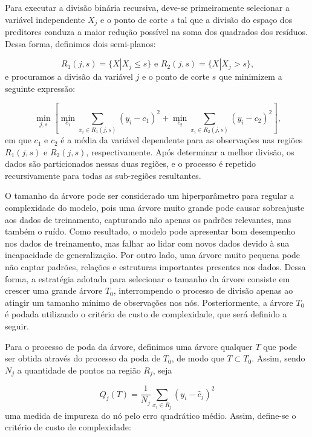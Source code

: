 \documentclass[
  12pt,
  a4paper,
]{scrreprt}
\begin{document}
\vspace{12pt}

Para executar a divisão binária recursiva, deve-se primeiramente
selecionar a variável independente \(X_j\) e o ponto de corte \(s\) tal
que a divisão do espaço dos preditores conduza a maior redução possível
na soma dos quadrados dos resíduos. Dessa forma, definimos dois
semi-planos:

\[
R_{1}\left(j, s\right) = \{X | X_j \leq s\} \text{ e } R_{2}\left(j, s\right) = \{X | X_j > s\}\text{,}
\] e procuramos a divisão da variável \(j\) e o ponto de corte \(s\) que
minimizem a seguinte expressão:

\[
\min_{j, s}\left[\min_{c_1} \sum_{x_i \in R_1\left(j, s\right)} \left(y_i - c_{1}\right)^2 + \min_{c_2} \sum_{x_i \in R_2\left(j, s\right)} \left(y_i - c_{2}\right)^2\right]\text{,}
\] em que \(c_1\) e \(c_2\) é a média da variável dependente para as
observações nas regiões \(R_1\left(j, s\right)\) e
\(R_2\left(j, s\right)\), respectivamente. Após determinar a melhor
divisão, os dados são particionados nessas duas regiões, e o processo é
repetido recursivamente para todas as sub-regiões resultantes.

\vspace{12pt}

O tamanho da árvore pode ser considerado um hiperparâmetro para regular
a complexidade do modelo, pois uma árvore muito grande pode causar
sobreajuste aos dados de treinamento, capturando não apenas os padrões
relevantes, mas também o ruído. Como resultado, o modelo pode apresentar
bom desempenho nos dados de treinamento, mas falhar ao lidar com novos
dados devido à sua incapacidade de generalização. Por outro lado, uma
árvore muito pequena pode não captar padrões, relações e estruturas
importantes presentes nos dados. Dessa forma, a estratégia adotada para
selecionar o tamanho da árvore consiste em crescer uma grande árvore
\(T_0\), interrompendo o processo de divisão apenas ao atingir um
tamanho mínimo de observações nos nós. Posteriormente, a árvore \(T_0\)
é podada utilizando o critério de custo de complexidade, que será
definido a seguir.

\vspace{12pt}

Para o processo de poda da árvore, definimos uma árvore qualquer \(T\)
que pode ser obtida através do processo da poda de \(T_0\), de modo que
\(T \subset T_0\). Assim, sendo \(N_j\) a quantidade de pontos na região
\(R_j\), seja

\[
Q_j\left(T\right) = \frac{1}{N_j} \sum_{x_i \in R_j}\left(y_i - \hat{c}_j\right)^2
\] uma medida de impureza do nó pelo erro quadrático médio. Assim,
define-se o critério de custo de complexidade:
\end{document}
